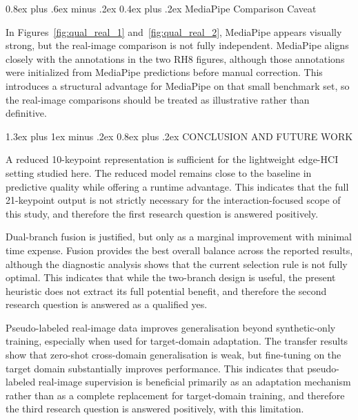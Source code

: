 \documentclass[10pt,letterpaper]{article}
\makeatletter
\renewcommand\section{\@startsection{section}{1}{\z@}%
  {1.3ex plus 1ex minus .2ex}%
  {0.8ex plus .2ex}%
  {\centering\normalfont\small\scshape}}
\renewcommand\subsubsection{\@startsection{subsubsection}{3}{\z@}%
  {0.8ex plus .6ex minus .2ex}%
  {0.4ex plus .2ex}%
  {\normalfont\small\itshape}}
\makeatother
\begin{document}
\subsubsection{MediaPipe Comparison Caveat}

\medskip
\noindent
In Figures~\ref{fig:qual_real_1} and~\ref{fig:qual_real_2}, MediaPipe appears visually strong, but the real-image comparison is not fully independent. MediaPipe aligns closely with the annotations in the two RH8 figures, although those annotations were initialized from MediaPipe predictions before manual correction. This introduces a structural advantage for MediaPipe on that small benchmark set, so the real-image comparisons should be treated as illustrative rather than definitive.

\section{CONCLUSION AND FUTURE WORK}

\noindent
A reduced 10-keypoint representation is sufficient for the lightweight edge-HCI setting studied here. The reduced model remains close to the baseline in predictive quality while offering a runtime advantage. This indicates that the full 21-keypoint output is not strictly necessary for the interaction-focused scope of this study, and therefore the first research question is answered positively.

\medskip
\noindent
Dual-branch fusion is justified, but only as a marginal improvement with minimal time expense. Fusion provides the best overall balance across the reported results, although the diagnostic analysis shows that the current selection rule is not fully optimal. This indicates that while the two-branch design is useful, the present heuristic does not extract its full potential benefit, and therefore the second research question is answered as a qualified yes.

\medskip
\noindent
Pseudo-labeled real-image data improves generalisation beyond synthetic-only training, especially when used for target-domain adaptation. The transfer results show that zero-shot cross-domain generalisation is weak, but fine-tuning on the target domain substantially improves performance. This indicates that pseudo-labeled real-image supervision is beneficial primarily as an adaptation mechanism rather than as a complete replacement for target-domain training, and therefore the third research question is answered positively, with this limitation.
\end{document}
